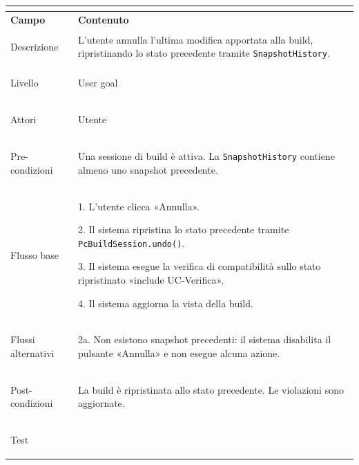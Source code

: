 \documentclass[11pt, a4paper]{article}
\begin{document}
\vspace{10pt}




\noindent

\begin{tabularx}{\textwidth}{|>{\bfseries}p{3.8cm}|X|}

\hline

\multicolumn{2}{|l|}{\textbf{UC4 --- Annulla modifica (undo)}} \\

\hline

Campo & \textbf{Contenuto} \\

\hline

Descrizione & L'utente annulla l'ultima modifica apportata alla build, ripristinando lo stato precedente tramite \texttt{SnapshotHistory}. \\

\hline

Livello & User goal \\

\hline

Attori & Utente \\

\hline

Pre-condizioni & Una sessione di build è attiva. La \texttt{SnapshotHistory} contiene almeno uno snapshot precedente. \\

\hline

Flusso base & 

1. L'utente clicca «Annulla».\newline

2. Il sistema ripristina lo stato precedente tramite \texttt{PcBuildSession.undo()}.\newline

3. Il sistema esegue la verifica di compatibilità sullo stato ripristinato «include UC-Verifica».\newline

4. Il sistema aggiorna la vista della build. \\

\hline

Flussi alternativi & 2a. Non esistono snapshot precedenti: il sistema disabilita il pulsante «Annulla» e non esegue alcuna azione. \\

\hline

Post-condizioni & La build è ripristinata allo stato precedente. Le violazioni sono aggiornate. \\

\hline

Test & \\

\hline

\end{tabularx}
\end{document}
